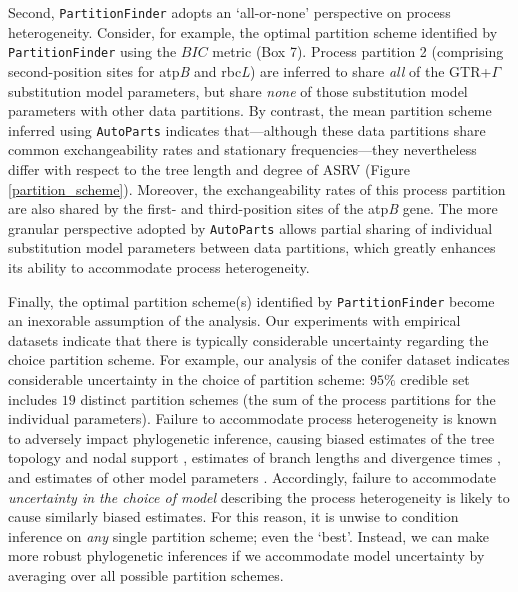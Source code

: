 \documentclass[11pt]{article}
\begin{document}
Second, \verb!PartitionFinder! adopts an `all-or-none' perspective on process heterogeneity.
Consider, for example, the optimal partition scheme identified by \verb!PartitionFinder! using the $BIC$ metric (Box 7).
Process partition 2 (comprising second-position sites for atp\emph{B} and rbc\emph{L}) are inferred to share \emph{all} of the GTR+$\Gamma$ substitution model parameters, but share \emph{none} of those substitution model parameters with other data partitions.
By contrast, the mean partition scheme inferred using \verb!AutoParts! indicates that---although these data partitions share common exchangeability rates and stationary frequencies---they nevertheless differ with respect to the tree length and degree of ASRV (Figure \ref{partition_scheme}).
Moreover, the exchangeability rates of this process partition are also shared by the first- and third-position sites of the atp\emph{B} gene.
The more granular perspective adopted by \verb!AutoParts! allows partial sharing of individual substitution model parameters between data partitions, which greatly enhances its ability to accommodate process heterogeneity.

Finally, the optimal partition scheme(s) identified by \verb!PartitionFinder! become an inexorable assumption of the analysis.
Our experiments with empirical datasets indicate that there is typically considerable uncertainty regarding the choice partition scheme.
For example, our analysis of the conifer dataset indicates considerable uncertainty in the choice of partition scheme: $95\%$ credible set includes $19$ distinct partition schemes (the sum of the process partitions for the individual parameters).
Failure to accommodate process heterogeneity is known to adversely impact phylogenetic inference, causing biased estimates of the tree topology and nodal support \citep{brandley05,brown07}, estimates of branch lengths and divergence times \citep{marshall06,poux08,vendetti08}, and estimates of other model parameters \citep{nylander04,pagel04}.
Accordingly, failure to accommodate \emph{uncertainty in the choice of model} describing the process heterogeneity is likely to cause similarly biased estimates.
For this reason, it is unwise to condition inference on \emph{any} single partition scheme; even the `best'.
Instead, we can make more robust phylogenetic inferences if we accommodate model uncertainty by averaging over all possible partition schemes.  

\end{document}
